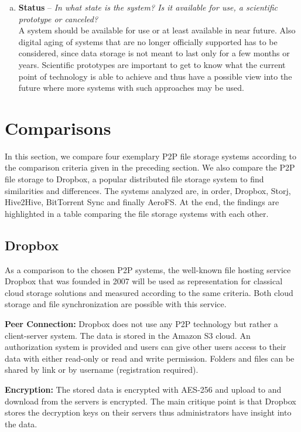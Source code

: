 \begin{enumerate}[(a)]
\item \textbf{Status} -- \textit{In what state is the system? Is it available for use, a scientific prototype or canceled?}\\
A system should be available for use or at least available in near future. Also digital aging of systems that are no longer officially supported has to be considered, since data storage is not meant to last only for a few months or years. Scientific prototypes are important to get to know what the current point of technology is able to achieve and thus have a possible view into the future where more systems with such approaches may be used.
\end{enumerate}

\section{Comparisons}
\label{comparisons}
In this section, we compare four exemplary P2P file storage systems according to the comparison criteria given in the preceding section. We also compare the P2P file storage to Dropbox, a popular distributed file storage system to find similarities and differences. The systems analyzed are, in order, Dropbox, Storj, Hive2Hive, BitTorrent Sync and finally AeroFS. At the end, the findings are highlighted in a table comparing the file storage systems with each other.

\subsection{Dropbox}
\label{subsec:dropbox}
As a comparison to the chosen P2P systems, the well-known file hosting service Dropbox that was founded in 2007 will be used as representation for classical cloud storage solutions and measured according to the same criteria. Both cloud storage and file synchronization are possible with this service.

\textbf{Peer Connection:} Dropbox does not use any P2P technology but rather a client-server system. The data is stored in the Amazon S3 cloud. An authorization system is provided and users can give other users access to their data with either read-only or read and write permission. Folders and files can be shared by link or by username (registration required).

\textbf{Encryption:} The stored data is encrypted with AES-256 and upload to and download from the servers is encrypted. The main critique point is that Dropbox stores the decryption keys on their servers thus administrators have insight into the data.

